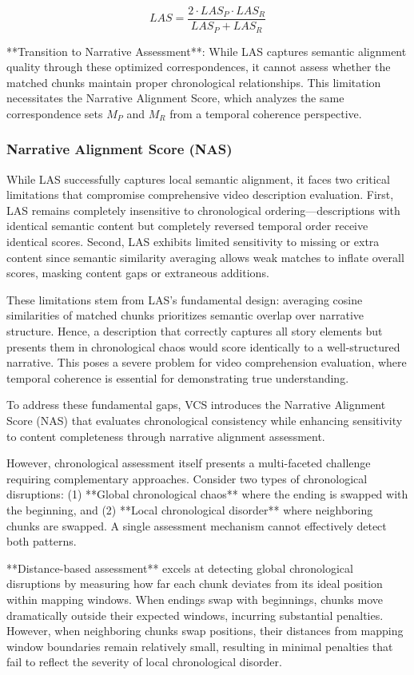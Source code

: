 \documentclass[main.tex]{subfiles}
\begin{document}
\begin{equation}
LAS = \frac{2 \cdot LAS_P \cdot LAS_R}{LAS_P + LAS_R}
\end{equation}

**Transition to Narrative Assessment**: While LAS captures semantic alignment quality through these optimized correspondences, it cannot assess whether the matched chunks maintain proper chronological relationships. This limitation necessitates the Narrative Alignment Score, which analyzes the same correspondence sets $M_P$ and $M_R$ from a temporal coherence perspective.

\subsubsection{Narrative Alignment Score (NAS)}
While LAS successfully captures local semantic alignment, it faces two critical limitations that compromise comprehensive video description evaluation. First, LAS remains completely insensitive to chronological ordering—descriptions with identical semantic content but completely reversed temporal order receive identical scores. Second, LAS exhibits limited sensitivity to missing or extra content since semantic similarity averaging allows weak matches to inflate overall scores, masking content gaps or extraneous additions.

These limitations stem from LAS's fundamental design: averaging cosine similarities of matched chunks prioritizes semantic overlap over narrative structure. Hence, a description that correctly captures all story elements but presents them in chronological chaos would score identically to a well-structured narrative. This poses a severe problem for video comprehension evaluation, where temporal coherence is essential for demonstrating true understanding.

To address these fundamental gaps, VCS introduces the Narrative Alignment Score (NAS) that evaluates chronological consistency while enhancing sensitivity to content completeness through narrative alignment assessment. 

However, chronological assessment itself presents a multi-faceted challenge requiring complementary approaches. Consider two types of chronological disruptions: (1) **Global chronological chaos** where the ending is swapped with the beginning, and (2) **Local chronological disorder** where neighboring chunks are swapped. A single assessment mechanism cannot effectively detect both patterns.

**Distance-based assessment** excels at detecting global chronological disruptions by measuring how far each chunk deviates from its ideal position within mapping windows. When endings swap with beginnings, chunks move dramatically outside their expected windows, incurring substantial penalties. However, when neighboring chunks swap positions, their distances from mapping window boundaries remain relatively small, resulting in minimal penalties that fail to reflect the severity of local chronological disorder.
\end{document}
